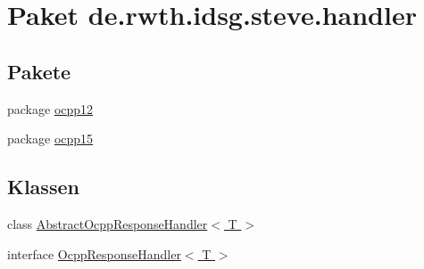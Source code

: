 \hypertarget{namespacede_1_1rwth_1_1idsg_1_1steve_1_1handler}{\section{Paket de.\-rwth.\-idsg.\-steve.\-handler}
\label{namespacede_1_1rwth_1_1idsg_1_1steve_1_1handler}
}
\subsection*{Pakete}
\begin{DoxyCompactItemize}
\item 
package \hyperlink{namespacede_1_1rwth_1_1idsg_1_1steve_1_1handler_1_1ocpp12}{ocpp12}
\item 
package \hyperlink{namespacede_1_1rwth_1_1idsg_1_1steve_1_1handler_1_1ocpp15}{ocpp15}
\end{DoxyCompactItemize}
\subsection*{Klassen}
\begin{DoxyCompactItemize}
\item 
class \hyperlink{classde_1_1rwth_1_1idsg_1_1steve_1_1handler_1_1_abstract_ocpp_response_handler_3_01_t_01_4}{Abstract\-Ocpp\-Response\-Handler$<$ T $>$}
\item 
interface \hyperlink{interfacede_1_1rwth_1_1idsg_1_1steve_1_1handler_1_1_ocpp_response_handler_3_01_t_01_4}{Ocpp\-Response\-Handler$<$ T $>$}
\end{DoxyCompactItemize}

